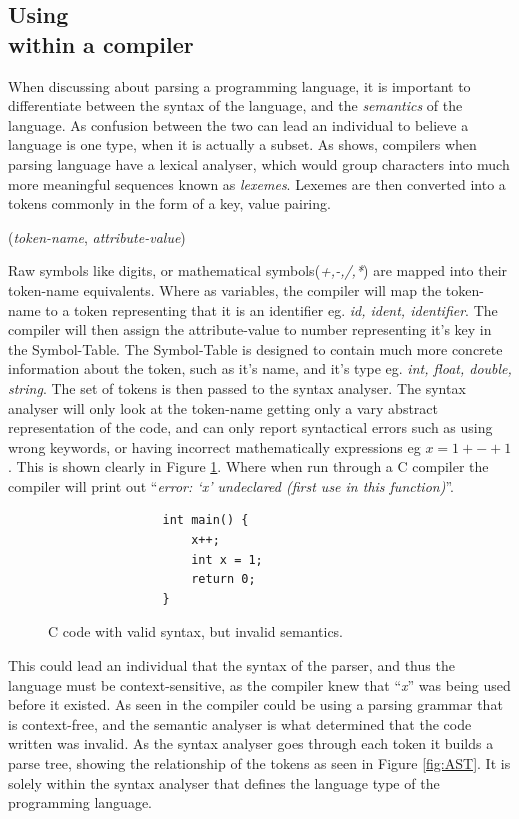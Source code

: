 \subsection{Using \hierarchy{} \\within a compiler}
When discussing about parsing a programming language, it is important to differentiate between the syntax of the language, and the \emph{semantics} of the language. As confusion between the two can lead an individual to believe a language is one type, when it is actually a subset. As \cite{DragonBook} shows, compilers when parsing language have a lexical analyser, which would group characters into much more meaningful sequences known as \emph{lexemes}. Lexemes are then converted into a tokens commonly in the form of a key, value pairing.
\vspace{12pt}
\centerline{(\emph{token-name}, \emph{attribute-value})}
\vspace{12pt}
Raw symbols like digits, or mathematical symbols(\emph{+,-,/,*}) are mapped into their token-name equivalents. Where as variables, the compiler will map the token-name to a token representing that it is an identifier eg. \emph{id, ident, identifier}. The compiler will then assign the attribute-value to number representing it's key in the Symbol-Table. The Symbol-Table is designed to contain much more concrete information about the token, such as it's name, and it's type eg. \emph{int, float, double, string}. The set of tokens is then passed to the syntax analyser. 
The syntax analyser will only look at the token-name getting only a vary abstract representation of the code, and can only report syntactical errors such as using wrong keywords, or having incorrect mathematically expressions eg $x = 1 + - + 1$. This is shown clearly in Figure \ref{fig:InvalidC}. Where when run through a C compiler the compiler will print out ``\emph{error: \lq{}x\rq{} undeclared (first use in this function)}''. 
\begin{figure}[ht!]
    \centering
    \begin{verbatim}
                int main() {
                    x++;
                    int x = 1;
                    return 0;
                }
    \end{verbatim}
    \caption{C code with valid syntax, but invalid semantics.}
    \label{fig:InvalidC}
\end{figure}
\newpage
This could lead an individual that the syntax of the parser, and thus the language must be context-sensitive, as the compiler knew that ``\emph{x}'' was being used before it existed. As seen in \cite{DragonBook} the compiler could be using a parsing grammar that is context-free, and the semantic analyser is what determined that the code written was invalid. As the syntax analyser goes through each token it builds a parse tree, showing the relationship of the tokens as seen in Figure \ref{fig:AST}. It is solely within the syntax analyser that defines the language type of the programming language.

